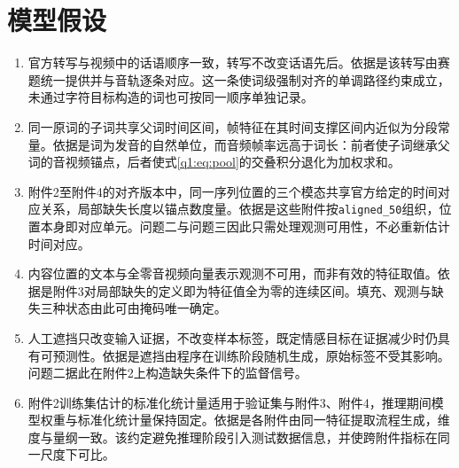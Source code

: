 \section{模型假设}
\begin{enumerate}[label=\arabic*.]
\item 官方转写与视频中的话语顺序一致，转写不改变话语先后。依据是该转写由赛题统一提供并与音轨逐条对应。这一条使词级强制对齐的单调路径约束成立，未通过字符目标构造的词也可按同一顺序单独记录。
\item 同一原词的子词共享父词时间区间，帧特征在其时间支撑区间内近似为分段常量。依据是词为发音的自然单位，而音频帧率远高于词长：前者使子词继承父词的音视频锚点，后者使式\eqref{q1:eq:pool}的交叠积分退化为加权求和。
\item 附件2至附件4的对齐版本中，同一序列位置的三个模态共享官方给定的时间对应关系，局部缺失长度以锚点数度量。依据是这些附件按\texttt{aligned\_50}组织，位置本身即对应单元。问题二与问题三因此只需处理观测可用性，不必重新估计时间对应。
\item 内容位置的文本\file{[UNK]}与全零音视频向量表示观测不可用，而非有效的特征取值。依据是附件3对局部缺失的定义即为特征值全为零的连续区间。填充、观测与缺失三种状态由此可由掩码唯一确定。
\item 人工遮挡只改变输入证据，不改变样本标签，既定情感目标在证据减少时仍具有可预测性。依据是遮挡由程序在训练阶段随机生成，原始标签不受其影响。问题二据此在附件2上构造缺失条件下的监督信号。
\item 附件2训练集估计的标准化统计量适用于验证集与附件3、附件4，推理期间模型权重与标准化统计量保持固定。依据是各附件由同一特征提取流程生成，维度与量纲一致。该约定避免推理阶段引入测试数据信息，并使跨附件指标在同一尺度下可比。
\end{enumerate}
